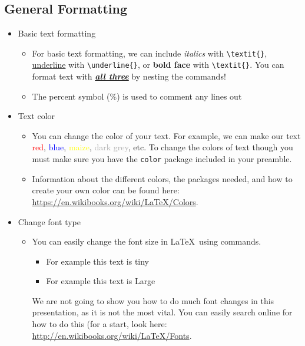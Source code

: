 \documentclass[]{article}%
\newcommand{\bs}{\textbackslash}
\newcommand{\TT}[1]{\texttt{#1}}
\newcommand{\tpc}{\textperiodcentered}
\theoremstyle{definition}
\begin{document}
	\subsection{General Formatting}
	\begin{itemize}
		\item Basic text formatting
		\begin{itemize}
			\item For basic text formatting, we can include \textit{italics} with \TT{\bs textit\{\tpc\}}, \underline{underline} with \TT{\bs underline\{\tpc\}}, or \textbf{bold face} with \TT{\bs textit\{\tpc\}}.
			You can format text with \textit{\underline{\textbf{all three}}} by nesting the commands!
			\item The percent symbol (\%) is used to comment any lines out
		\end{itemize}
		\item Text color
		\begin{itemize}
			\item You can change the color of your text.
			For example, we can make our text \textcolor{red}{red}, \textcolor{blue}{blue}, \textcolor{yellow}{maize}, \textcolor{darkgrey}{dark grey}, etc.
			To change the colors of text though you must make sure you have the \TT{color} package included in your preamble.
			\item Information about the different colors, the packages needed, and how to create your own color can be found here: \url{https://en.wikibooks.org/wiki/LaTeX/Colors}.
		\end{itemize}
		\item Change font type
		\begin{itemize}
			\item You can easily change the font size in \LaTeX\ using commands.
			\begin{itemize}
				\item \tiny For example this text is tiny
				\item \LARGE For example this text is Large
			\end{itemize}
			We are not going to show you how to do much font changes in this presentation, as it is not the most vital.
			You can easily search online for how to do this (for a start, look here: \url{http://en.wikibooks.org/wiki/LaTeX/Fonts}.

\end{itemize}
\end{itemize}
\end{document}
